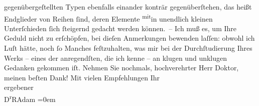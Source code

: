 \begin{ledgroupsized}[t]{13cm}
               gegenübergeſtellten Typen ebenfalls einander konträr gegenüberſtehen, das heißt
               Endglieder von Reihen ſind, deren Elemente \substVorne{}\textsuperscript{mit}\substDazwischen{}in\substHinten{} unendlich kleinen Unterſchieden ſich ſteigernd gedacht werden können. –\pend
           \pstart
           Ich muß es, um Ihre Geduld nicht zu erſchöpfen, \strikeout{\textcolor{gray}{an}} bei dieſen Anmerkungen bewenden laſſen: obwohl ich Luſt hätte, noch ſo Manches
               feſtzuhalten, was mir bei der Durchſtudierung Ihres Werks – eines der anregendſten,
               die ich kenne – an klugen und unklugen Gedanken gekommen iſt.\pend
           \pstart
           Nehmen Sie nochmals, hochverehrter Herr Doktor, meinen beſten {\pb}Dank!\pend
           \pstart
           Mit vielen Empfehlungen Ihr{\\[\baselineskip]}ergebener{\\[\baselineskip]}\spacefill\mbox{D\textsuperscript{r}RAdam}\pend
           \leftskip=0em{}
         
         \endnumbering{}\end{ledgroupsized}  \newcommand{\dateiname}{L02483}\newcommand{\titel}{Robert Adam an Arthur Schnitzler, 21. 3. 1927}\newcommand{\editorInnen}{Martin Anton Müller und Gerd-Hermann Susen}
      